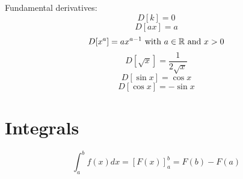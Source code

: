 \documentclass{article}
\begin{document}
Fundamental derivatives:
\begin{equation}
D [k] = 0
\end{equation}
\begin{equation}
D [ax] = a
\end{equation}
\begin{equation}
D [x^a] = ax^{a-1} \textnormal{ with } a \in \mathbb{R} \textnormal{ and } x > 0
\end{equation}
\begin{equation}
D [\sqrt{x}] = \frac{1}{2\sqrt{x}}
\end{equation}
\begin{equation}
D [\sin{x}] = \cos{x}
\end{equation}
\begin{equation}
D [\cos{x}] = -\sin{x}
\end{equation}

\section{Integrals}

\begin{equation}
\int_{a}^{b} f(x) dx = [F(x)]_{a}^{b} = F(b) - F(a)
\end{equation}
\end{document}
